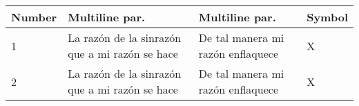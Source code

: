 \documentclass[a4paper,twoside,titlepage,12pt]{article}
\begin{document}
    \begin{tabularx}{0.5\linewidth}{p{2cm} X X p{2cm}}
    \toprule
    Number & Multiline par. & Multiline par. & Symbol \\ \midrule
    1 & La razón de la sinrazón que a mi razón se hace & De tal manera mi razón enflaquece & X\\
    2 & La razón de la sinrazón que a mi razón se hace & De tal manera mi razón enflaquece & X\\ 
    \bottomrule
    \end{tabularx}







\end{document}
